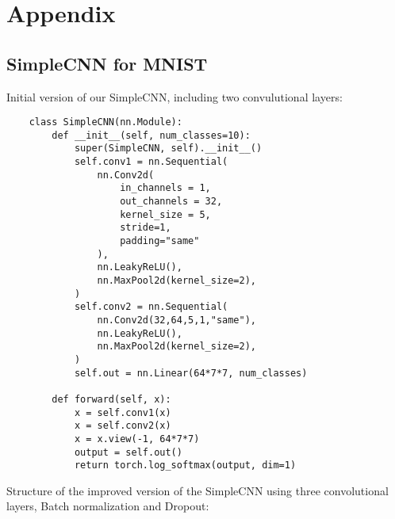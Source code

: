 \section{Appendix}
\subsection{SimpleCNN for MNIST}\label{codeSnippets}
Initial version of our SimpleCNN, including two convulutional layers:\@

\begin{verbatim}
    class SimpleCNN(nn.Module):
        def __init__(self, num_classes=10):
            super(SimpleCNN, self).__init__()
            self.conv1 = nn.Sequential(
                nn.Conv2d(
                    in_channels = 1,
                    out_channels = 32,
                    kernel_size = 5,
                    stride=1,
                    padding="same"
                ),
                nn.LeakyReLU(),
                nn.MaxPool2d(kernel_size=2),
            )
            self.conv2 = nn.Sequential(
                nn.Conv2d(32,64,5,1,"same"),
                nn.LeakyReLU(),
                nn.MaxPool2d(kernel_size=2),
            )
            self.out = nn.Linear(64*7*7, num_classes)

        def forward(self, x):
            x = self.conv1(x)
            x = self.conv2(x)
            x = x.view(-1, 64*7*7)
            output = self.out()
            return torch.log_softmax(output, dim=1)
\end{verbatim}


Structure of the improved version of the SimpleCNN using three convolutional layers, Batch normalization and Dropout:\@


